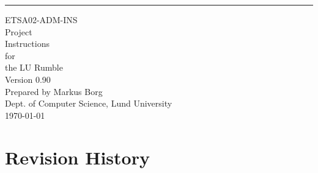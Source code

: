 \documentclass{scrreprt}
\date{}
\def\myversion{0.90 }
\begin{document}
\begin{flushright}
    \rule{16cm}{5pt}\vskip1cm
    \begin{bfseries}
    	\LARGE{ETSA02-ADM-INS}\\
    	\vspace{1.5cm}
        \Huge{Project\\ Instructions}\\
        \vspace{0.5cm}
        for\\
        \vspace{0.5cm}
        the LU Rumble\\
        \vspace{1.5cm}
        \LARGE{Version \myversion}\\ %
        \vspace{1.5cm}
        Prepared by Markus Borg\\
        Dept. of Computer Science, Lund University\\
        \vspace{1.5cm}
        \today\\
    \end{bfseries}
\end{flushright}

\tableofcontents

\chapter*{Revision History}
\end{document}
